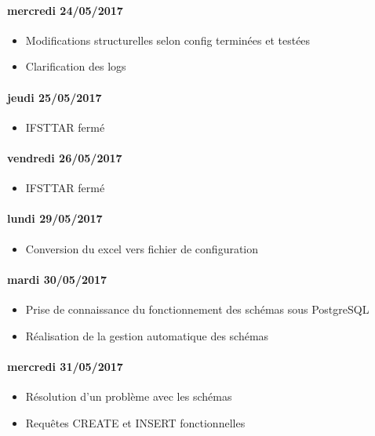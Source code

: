 \paragraph{mercredi 24/05/2017}
\begin{itemize}
  \item Modifications structurelles selon config terminées et testées
  \item Clarification des logs
\end{itemize}

\paragraph{jeudi 25/05/2017}
\begin{itemize}
  \item IFSTTAR fermé
\end{itemize}

\paragraph{vendredi 26/05/2017}
\begin{itemize}
  \item IFSTTAR fermé
\end{itemize}

\paragraph{lundi 29/05/2017}
\begin{itemize}
  \item Conversion du excel vers fichier de configuration
\end{itemize}

\paragraph{mardi 30/05/2017}
\begin{itemize}
  \item Prise de connaissance du fonctionnement des schémas sous PostgreSQL
  \item Réalisation de la gestion automatique des schémas
\end{itemize}

\paragraph{mercredi 31/05/2017}
\begin{itemize}
  \item Résolution d'un problème avec les schémas
  \item Requêtes CREATE et INSERT fonctionnelles
\end{itemize}

